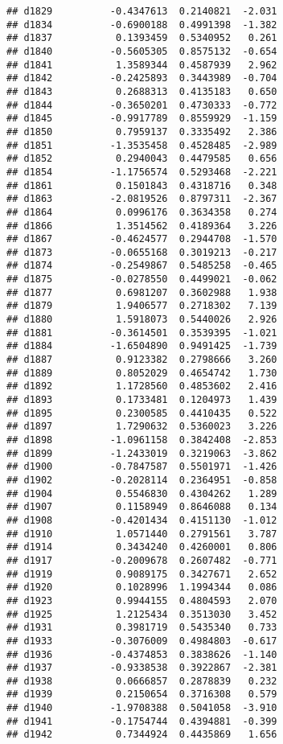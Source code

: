 \documentclass[
]{article}
\begin{document}
\begin{verbatim}
## d1829          -0.4347613  0.2140821  -2.031
## d1834          -0.6900188  0.4991398  -1.382
## d1837           0.1393459  0.5340952   0.261
## d1840          -0.5605305  0.8575132  -0.654
## d1841           1.3589344  0.4587939   2.962
## d1842          -0.2425893  0.3443989  -0.704
## d1843           0.2688313  0.4135183   0.650
## d1844          -0.3650201  0.4730333  -0.772
## d1845          -0.9917789  0.8559929  -1.159
## d1850           0.7959137  0.3335492   2.386
## d1851          -1.3535458  0.4528485  -2.989
## d1852           0.2940043  0.4479585   0.656
## d1854          -1.1756574  0.5293468  -2.221
## d1861           0.1501843  0.4318716   0.348
## d1863          -2.0819526  0.8797311  -2.367
## d1864           0.0996176  0.3634358   0.274
## d1866           1.3514562  0.4189364   3.226
## d1867          -0.4624577  0.2944708  -1.570
## d1873          -0.0655168  0.3019213  -0.217
## d1874          -0.2549867  0.5485258  -0.465
## d1875          -0.0278550  0.4499021  -0.062
## d1877           0.6981207  0.3602988   1.938
## d1879           1.9406577  0.2718302   7.139
## d1880           1.5918073  0.5440026   2.926
## d1881          -0.3614501  0.3539395  -1.021
## d1884          -1.6504890  0.9491425  -1.739
## d1887           0.9123382  0.2798666   3.260
## d1889           0.8052029  0.4654742   1.730
## d1892           1.1728560  0.4853602   2.416
## d1893           0.1733481  0.1204973   1.439
## d1895           0.2300585  0.4410435   0.522
## d1897           1.7290632  0.5360023   3.226
## d1898          -1.0961158  0.3842408  -2.853
## d1899          -1.2433019  0.3219063  -3.862
## d1900          -0.7847587  0.5501971  -1.426
## d1902          -0.2028114  0.2364951  -0.858
## d1904           0.5546830  0.4304262   1.289
## d1907           0.1158949  0.8646088   0.134
## d1908          -0.4201434  0.4151130  -1.012
## d1910           1.0571440  0.2791561   3.787
## d1914           0.3434240  0.4260001   0.806
## d1917          -0.2009678  0.2607482  -0.771
## d1919           0.9089175  0.3427671   2.652
## d1920           0.1028996  1.1994344   0.086
## d1923           0.9944155  0.4804593   2.070
## d1925           1.2125434  0.3513030   3.452
## d1931           0.3981719  0.5435340   0.733
## d1933          -0.3076009  0.4984803  -0.617
## d1936          -0.4374853  0.3838626  -1.140
## d1937          -0.9338538  0.3922867  -2.381
## d1938           0.0666857  0.2878839   0.232
## d1939           0.2150654  0.3716308   0.579
## d1940          -1.9708388  0.5041058  -3.910
## d1941          -0.1754744  0.4394881  -0.399
## d1942           0.7344924  0.4435869   1.656

\end{verbatim}
\end{document}
